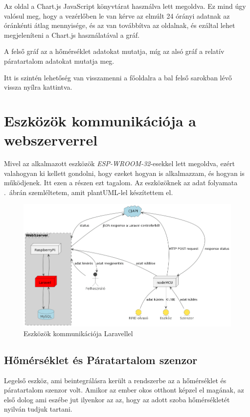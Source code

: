 \documentclass[
]{thesis-ekf}
\theoremstyle{definition}
\theoremstyle{remark}
\begin{document}
	Az oldal a Chart.js JavaScript könyvtárat használva lett megoldva. Ez mind úgy valósul meg, hogy a vezérlőben le van kérve az elmúlt 24 órányi adatnak az óránkénti átlag mennyisége, és az van továbbítva az oldalnak, és ezáltal lehet megjeleníteni a Chart.js használatával a gráf.
	
	A felső gráf az a hőmérséklet adatokat mutatja, míg az alsó gráf a relatív páratartalom adatokat mutatja meg. 
	
	Itt is szintén lehetőség van visszamenni a főoldalra a bal felső sarokban lévő vissza nyílra kattintva.
	\section{Eszközök kommunikációja a webszerverrel}\label{csatlakozas-a-webszerverre}
	Mivel az alkalmazott eszközök \emph{ESP-WROOM-32}-esekkel lett megoldva, ezért valahogyan ki kellett gondolni, hogy ezeket hogyan is alkalmazzam, és hogyan is működjenek. Itt ezen a részen ezt tagalom. Az eszközöknek az adat folyamata .~ábrán szemléltetem, amit plantUML-lel készítettem el.
	
	\begin{figure}[ht!]
		\centering
		\includegraphics[width=1\textwidth]{./src/HU_sensor with webserver uml diagram}
		\caption{Eszközök kommunikációja Laravellel}
		\label{esp-laravel.communication}
	\end{figure}
	
	\subsection{Hőmérséklet és Páratartalom szenzor}
	Legelső eszköz, ami beintegrálásra került a rendszerbe az a hőmérséklet és páratartalom szenzor volt. Amikor az ember okos otthont képzel el magának, az első dolog ami eszébe jut ilyenkor az az, hogy az adott szoba hőmérsékletét nyilván tudjuk tartani. 
	
\end{document}
